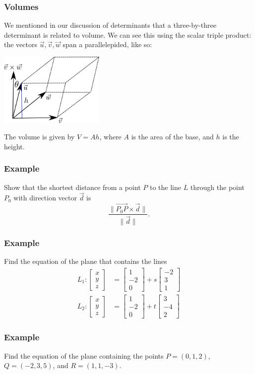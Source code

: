 \documentclass[11pt,t]{beamer}
\newcommand{\len}[1]{\lVert #1\rVert}
\begin{document}
\begin{frame}\frametitle{Volumes}
 We mentioned in our discussion of determinants that a three-by-three determinant is related to volume. We can see this using the scalar triple product: the vectors $\vec{u},\vec{v},\vec{w}$ span a parallelepided, like so:
\begin{center}
 \includegraphics[width=2in]{parallelepiped2.pdf}
\end{center}
The volume is given by $V = Ah$, where $A$ is the area of the base, and $h$ is the height.
\end{frame}
\begin{frame}\frametitle{Example}
 Show that the shortest distance from a point $P$ to the line $L$ through the point $P_0$ with direction vector $\vec{d}$ is
\[
 \frac{\len{\overrightarrow{P_0P}\times\vec{d}}}{\len{\vec{d}}}.
\]

\end{frame}
\begin{frame}\frametitle{Example}
 Find the equation of the plane that contains the lines
\begin{align*}
 L_1: \begin{bmatrix}x\\y\\z\end{bmatrix} &= \begin{bmatrix}1\\-2\\0\end{bmatrix}+s\begin{bmatrix}-2\\3\\1\end{bmatrix}\\
L_2: \begin{bmatrix}x\\y\\z\end{bmatrix} & = \begin{bmatrix}1\\-2\\0\end{bmatrix}+t\begin{bmatrix}3\\-4\\2\end{bmatrix}
\end{align*}

\end{frame}
\begin{frame}\frametitle{Example}
 Find the equation of the plane containing the points $P=(0,1,2)$, $Q=(-2,3,5)$, and $R=(1,1,-3)$.
\end{frame}
\end{document}
